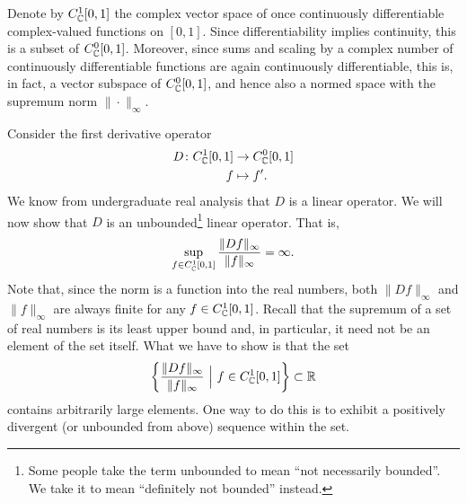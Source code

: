 \begin{example}
Denote by $C^1_{\mathbb{C}}[0,1]$ the complex vector space of once continuously differentiable complex-valued functions on $[0,1]$. Since differentiability implies continuity, this is a subset of $C^0_{\mathbb{C}}[0,1]$. Moreover, since sums and scaling by a complex number of continuously differentiable functions are again continuously differentiable, this is, in fact, a vector subspace of $C^0_{\mathbb{C}}[0,1]$, and hence also a normed space with the supremum norm $\|\cdot\|_{\infty}$.

Consider the first derivative operator
\begin{align*}
D \colon C^1_{\mathbb{C}}[0,1] & \to C^0_{\mathbb{C}}[0,1]\\
 f & \mapsto f'.
\end{align*}
We know from undergraduate real analysis that $D$ is a linear operator. We will now show that $D$ is an unbounded\footnote{Some people take the term unbounded to mean ``not necessarily bounded''. We take it to mean ``definitely not bounded'' instead.} linear operator. That is,
\begin{equation*}
\sup_{f\in C^1_{\mathbb{C}}[0,1]} \frac{\|Df\|_{\infty}}{\|f\|_{\infty}} = \infty.
\end{equation*}
Note that, since the norm is a function into the real numbers, both $\|Df\|_{\infty}$ and $\|f\|_{\infty}$ are always finite for any $f\in C^1_{\mathbb{C}}[0,1]$. Recall that the supremum of a set of real numbers is its least upper bound and, in particular, it need not be an element of the set itself. What we have to show is that the set
\begin{equation*}
\biggl\{ \frac{\|Df\|_{\infty}}{\|f\|_{\infty}} \ \Big| \ f\in C^1_{\C}[0,1] \biggr\} \subset \R
\end{equation*}
contains arbitrarily large elements. One way to do this is to exhibit a positively divergent (or unbounded from above) sequence within the set. 


\end{example}
